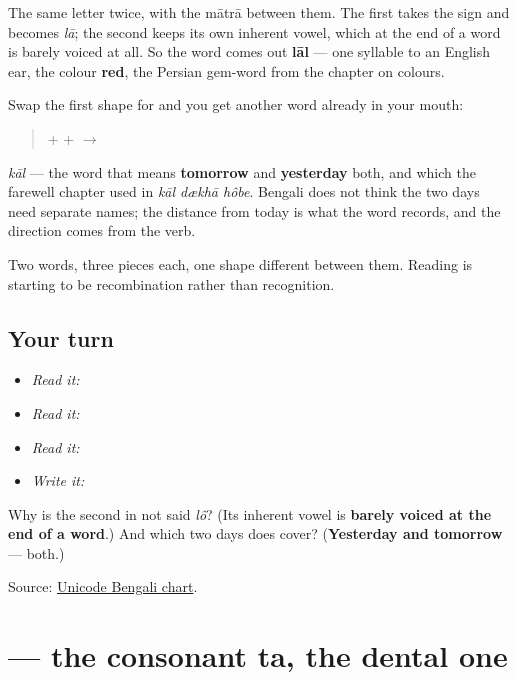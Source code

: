 The same letter twice, with the mātrā between them. The first \textbf{} takes the sign and becomes \emph{lā}; the second keeps its own inherent vowel, which at the end of a word is barely voiced at all. So the word comes out \textbf{lāl} — one syllable to an English ear, the colour \textbf{red}, the Persian gem-word from the chapter on colours.

Swap the first shape for \textbf{} and you get another word already in your mouth:

\begin{quote}
\textbf{} + \textbf{} + \textbf{} $\to$ \textbf{}
\end{quote}

\emph{kāl} — the word that means \textbf{tomorrow} and \textbf{yesterday} both, and which the farewell chapter used in \emph{kāl dækhā hôbe}. Bengali does not think the two days need separate names; the distance from today is what the word records, and the direction comes from the verb.

Two words, three pieces each, one shape different between them. Reading is starting to be recombination rather than recognition.

\subsection*{Your turn}
\begin{itemize}
\raggedright
  \item \emph{Read it:} 
  \item \emph{Read it:} 
  \item \emph{Read it:} 
  \item \emph{Write it:} 
\end{itemize}

\begin{tcolorbox}[breakable,colback=teal!4,colframe=teal!35!black,title={Before you move on}]
Why is the second \textbf{} in \textbf{} not said \emph{lô}? (Its inherent vowel is \textbf{barely voiced at the end of a word}.) And which two days does \textbf{} cover? (\textbf{Yesterday and tomorrow} — both.)

Source: \href{https://www.unicode.org/charts/PDF/U0980.pdf}{Unicode Bengali chart}.
\end{tcolorbox}
\section[tô]{ — the consonant ta, the dental one}

